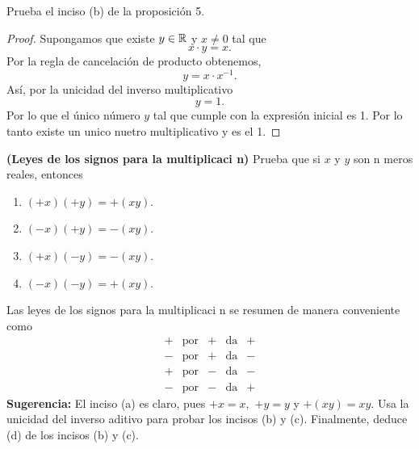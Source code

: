 \documentclass[12pt,a4paper]{article}
\begin{document}
    \begin{problema}
        Prueba el inciso (b) de la proposición 5.
    \end{problema}

    \begin{proof}
        Supongamos que existe $y\in\mathbb{R}$ y $x\neq0$ tal que
        \begin{equation*}
            x\cdot y=x.
        \end{equation*}
        Por la regla de cancelación de producto obtenemos,
        \begin{equation*}
            y=x\cdot x^{-1}.
        \end{equation*}
        Así, por la unicidad del inverso multiplicativo
        \begin{equation*}
            y=1.
        \end{equation*}
        Por lo que el único número $y$ tal que cumple con la expresión inicial es 1. Por lo tanto existe un unico nuetro multiplicativo y es el 1.
    \end{proof}
    
    \begin{problema}
        \textbf{(Leyes de los signos para la multiplicaci n)} Prueba que
        si $x$ y $y$ son n meros reales, entonces
        \begin{enumerate}
            \item[(a)] $(+x)\left(+y\right)=+(xy).$ 
            \item[(b)] $(-x)\left(+y\right)=-(xy).$
            \item[(c)] $\left(+x\right)\left(-y\right)=-\left(xy\right).$
            \item[(d)] $(-x)(-y)=+\left(xy\right).$
        \end{enumerate}
        Las leyes de los signos para la multiplicaci n se resumen de manera
        conveniente como 
        \begin{equation*}
            \begin{array}{ccccc}
            + & \text{por} & + & \text{da} & +\\
            - & \text{por} & + & \text{da} & -\\
            + & \text{por} & - & \text{da} & -\\
            - & \text{por} & - & \text{da} & +
            \end{array}
        \end{equation*}
        \textbf{Sugerencia:} El inciso (a) es claro, pues $+x=x,$ $+y=y$
        y $+\left(xy\right)=xy.$ Usa la unicidad del inverso aditivo para
        probar los incisos (b) y (c). Finalmente, deduce (d) de los incisos
        (b) y (c).
    \end{problema}
\end{document}
